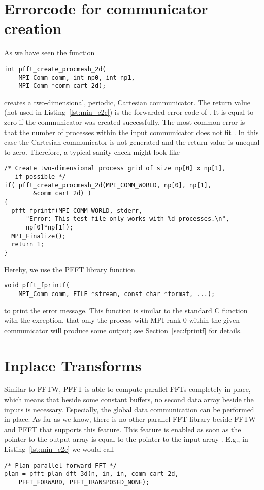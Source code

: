 \section{Errorcode for communicator creation}
As we have seen the function
\begin{lstlisting}
int pfft_create_procmesh_2d(
    MPI_Comm comm, int np0, int np1,
    MPI_Comm *comm_cart_2d);
\end{lstlisting}
creates a two-dimensional, periodic, Cartesian communicator. The  return value
(not used in Listing~\ref{lst:min_c2c}) is the forwarded error code of .
It is equal to zero if the communicator was created successfully.
The most common error is that the number of processes within the input
communicator  does not fit . In this case the Cartesian communicator
is not generated and the return value is unequal to zero. Therefore, a typical sanity check might look like
\begin{lstlisting}
/* Create two-dimensional process grid of size np[0] x np[1],
   if possible */
if( pfft_create_procmesh_2d(MPI_COMM_WORLD, np[0], np[1],
        &comm_cart_2d) )
{
  pfft_fprintf(MPI_COMM_WORLD, stderr,
      "Error: This test file only works with %d processes.\n",
      np[0]*np[1]);
  MPI_Finalize();
  return 1;
}
\end{lstlisting}
Hereby, we use the PFFT library function
\begin{lstlisting}
void pfft_fprintf(
    MPI_Comm comm, FILE *stream, const char *format, ...);
\end{lstlisting}
to print the error message.
This function is similar to the standard C function  with the exception, that only the process with MPI rank $0$
within the given communicator  will produce some output; see Section~\ref{sec:fprintf} for details.

\section{Inplace Transforms}
Similar to FFTW, PFFT is able to compute parallel FFTs completely in place, which means that beside some
constant buffers, no second data array beside the inputs is necessary. Especially, the global data communication
can be performed in place. As far as we know, there is no other parallel FFT library beside FFTW and PFFT that
supports this feature. 
This feature is enabled as soon as the pointer to the output array  is equal to the pointer to the input array .
E.g., in Listing~\ref{lst:min_c2c} we would call
\begin{lstlisting}[firstnumber=34]
/* Plan parallel forward FFT */
plan = pfft_plan_dft_3d(n, in, in, comm_cart_2d,
    PFFT_FORWARD, PFFT_TRANSPOSED_NONE);
\end{lstlisting}

